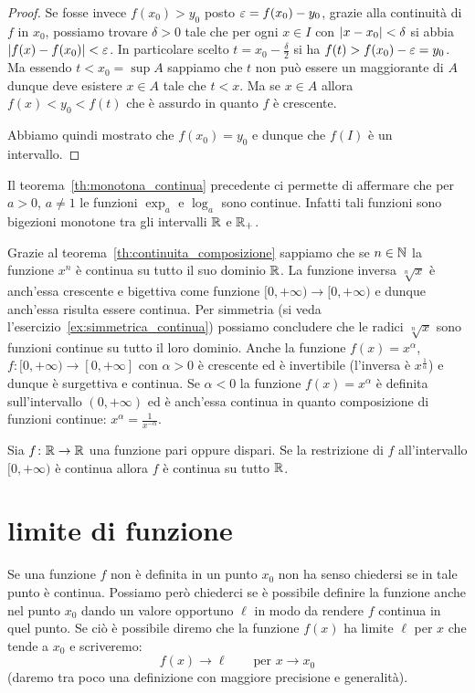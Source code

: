 \begin{proof}
Se fosse invece $f(x_0)>y_0$ posto $\varepsilon = f(x_0)-y_0$,
grazie alla continuità di $f$ in $x_0$,
possiamo trovare $\delta>0$ tale che per ogni $x\in I$
con ${\left|x-x_0\right|}<\delta$ si abbia ${\left|f(x)-f(x_0)\right|}<\varepsilon$.
In particolare scelto $t = x_0 - \frac \delta 2$
si ha $f(t) > f(x_0)-\varepsilon = y_0$. 
Ma essendo $t<x_0 = \sup A$ sappiamo che $t$ non può essere 
un maggiorante di $A$ dunque deve esistere $x\in A$
tale che $t<x$. 
Ma se $x\in A$ allora $f(x) < y_0 < f(t)$
che è assurdo in quanto $f$ è crescente.

Abbiamo quindi mostrato che $f(x_0)=y_0$ e dunque
che $f(I)$ è un intervallo.
\end{proof}
%

Il teorema~\ref{th:monotona_continua} precedente ci permette di affermare che per $a>0$, $a\neq 1$ 
le funzioni 
$\exp_a$ e $\log_a$ sono continue. 
Infatti tali funzioni sono bigezioni monotone tra 
gli intervalli $\mathbb R$ e $\mathbb R_+$.

Grazie al teorema~\ref{th:continuita_composizione} sappiamo 
che se $n\in \mathbb N$ la funzione $x^n$ è continua su tutto il suo 
dominio $\mathbb R$. 
La funzione inversa $\sqrt[n]{x}$ è anch'essa crescente e 
bigettiva come funzione $[0,+\infty)\to[0,+\infty)$ e dunque 
anch'essa risulta essere continua.
Per simmetria (si veda l'esercizio~\ref{ex:simmetrica_continua}) 
possiamo concludere 
che le radici $\sqrt[n]{x}$ sono 
funzioni continue su tutto il loro dominio.
Anche la funzione $f(x) = x^\alpha$, $f\colon [0,+\infty)\to [0,+\infty]$ 
con $\alpha>0$ è crescente ed è invertibile (l'inversa è $x^{\frac 1 \alpha}$)
e dunque è surgettiva e continua.
Se $\alpha<0$ la funzione $f(x)=x^\alpha$ è definita sull'intervallo 
$(0,+\infty)$ ed è anch'essa continua in quanto 
composizione di funzioni continue: $x^{\alpha} = \frac{1}{x^{-\alpha}}$.

%
\begin{exercise}\label{ex:simmetrica_continua}
  Sia $f\colon \mathbb R\to \mathbb R$ una funzione pari oppure dispari.
  Se la restrizione di $f$ all'intervallo $[0,+\infty)$ 
  è continua allora $f$ è continua su tutto $\mathbb R$.
\end{exercise}


\section{limite di funzione}

Se una funzione $f$ non è definita in un punto $x_0$ non ha senso chiedersi
se in tale punto è continua. 
Possiamo però chiederci se è possibile definire la funzione anche nel punto 
$x_0$ dando un valore opportuno $\ell$ in modo da rendere $f$ continua 
in quel punto. 
Se ciò è possibile diremo che la funzione $f(x)$ ha limite $\ell$ 
per $x$ che tende a $x_0$ e scriveremo:
\[
  f(x) \to \ell \qquad \text{per $x\to x_0$}
\]
(daremo tra poco una definizione con maggiore precisione e generalità).

